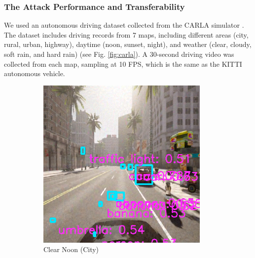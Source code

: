 \clearpage

\subsubsection{The Attack Performance and Transferability}

We used an autonomous driving dataset collected from the CARLA simulator \citep{deschaud2021kitticarla}. The dataset includes driving records from 7 maps, including different areas (city, rural, urban, highway), daytime (noon, sunset, night), and weather (clear, cloudy, soft rain, and hard rain) (see Fig. \ref{fig:carla}). A 30-second driving video was collected from each map, sampling at 10 FPS, which is the same as the KITTI autonomous vehicle. 

\begin{figure}[H]
    \centering
    \begin{subfigure}[b]{0.48\textwidth}
        \centering
        \includegraphics[width=\textwidth]{figures/chapter_detection/hardware/clear_noon_city.png}
        \caption{Clear Noon (City)}
        \label{fig:clear_noon} 
    \end{subfigure}
    \begin{subfigure}[b]{0.48\textwidth}
        \centering

\end{subfigure}
\end{figure}
